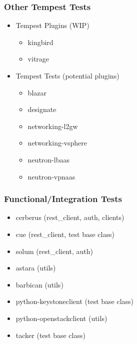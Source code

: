 \documentclass[aspectratio=169,11pt,hyperref={colorlinks=true}]{beamer}
\begin{document}
\begin{frame}
    \frametitle{Other Tempest Tests}
    \begin{itemize}
        \item{Tempest Plugins (WIP)}
            \begin{itemize}
                \item{kingbird}
                \item{vitrage}
            \end{itemize}
    \end{itemize}
    \begin{itemize}
        \item{Tempest Tests (potential plugins)}
            \begin{itemize}
                \item{blazar}
                \item{designate}
                \item{networking-l2gw}
                \item{networking-vsphere}
                \item{neutron-lbaas}
                \item{neutron-vpnaas}
            \end{itemize}
    \end{itemize}
\end{frame}

\begin{frame}
    \frametitle{Functional/Integration Tests}
    \begin{itemize}
        \item{cerberus (rest\_client, auth, clients)}
        \item{cue (rest\_client, test base class)}
        \item{solum (rest\_client, auth)}
    \end{itemize}
    \begin{itemize}
        \item{astara (utils)}
        \item{barbican (utils)}
        \item{python-keystoneclient (test base class)}
        \item{python-openstackclient (utils)}
        \item{tacker (test base class)}
    \end{itemize}
\end{frame}
\end{document}
